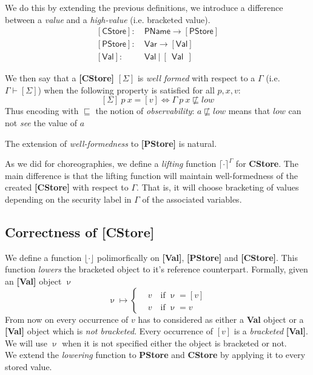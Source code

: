 \documentclass[12pt,a4paper,twoside]{book}
\begin{document}
We do this by extending the previous definitions, we introduce a difference between a \emph{value} and a \emph{high-value} (i.e. bracketed value).
\begin{align*}
	\mathsf{[CStore]}:&~\mathsf{PName} \rightarrow \mathsf{[PStore]}\\
	\mathsf{[PStore]}:&~\mathsf{Var} \rightarrow \mathsf{[Val]}\\
	\mathsf{[Val]}:&~ \mathsf{Val}~|~[~~\mathsf{Val}~~]
\end{align*}

We then say that a \textbf{[CStore]} $[\Sigma]$ is \emph{well formed} with respect to a $\Gamma$ (i.e. $\Gamma \vdash [\Sigma]$) when the following property is satisfied for all $p, x, v$:
$$
	[\Sigma]~p~x = [v] \iff \Gamma~p~x \not\sqsubseteq low
$$
Thus encoding with $\sqsubseteq$ the notion of \emph{observability}: $a \not\sqsubseteq low$ means that $low$ can not \emph{see} the value of $a$

The extension of \emph{well-formedness} to \textbf{[PStore]} is natural.

As we did for choreographies, we define a \emph{lifting} function $\lceil \cdot \rceil^\Gamma$ for \textbf{CStore}. The main difference is that the lifting function will maintain well-formedness of the created \textbf{[CStore]} with respect to $\Gamma$. That is, it will choose bracketing of values depending on the security label in $\Gamma$ of the associated variables.

\subsection{Correctness of \textbf{[CStore]}}
We define a function $\lfloor \cdot \rfloor$ polimorfically on \textbf{[Val]}, \textbf{[PStore]} and \textbf{[CStore]}. This function \emph{lowers} the bracketed object to it's reference counterpart.
Formally, given an \textbf{[Val]} object $\upnu$
$$
\upnu \mapsto \begin{cases}
	&v \quad \text{if $\upnu = [v]$}\\
    &v \quad \text{if $\upnu = v$}
    \end{cases}
$$
From now on every occurrence of $v$ has to considered as either a \textbf{Val} object or a \textbf{[Val]} object which is \emph{not bracketed}. Every occurrence of $[v]$ is a \emph{bracketed} \textbf{[Val]}. We will use $\upnu$ when it is not specified either the object is bracketed or not.\\
We extend the \emph{lowering} function to \textbf{PStore} and \textbf{CStore} by applying it to every stored value.
\end{document}
